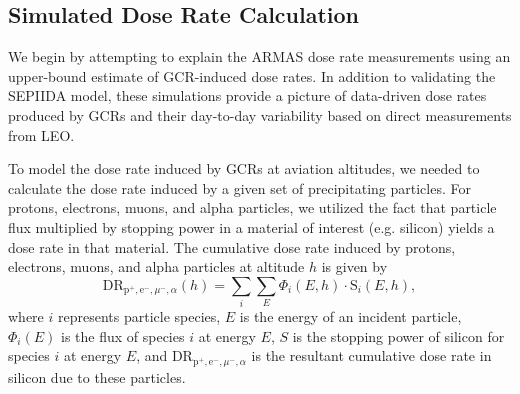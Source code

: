 \documentclass[draft]{agujournal2019}
\begin{document}
\subsection{Simulated Dose Rate Calculation}
\label{section:model:doserate_conversion}
We begin by attempting to explain the ARMAS dose rate measurements using an upper-bound estimate of GCR-induced dose rates. In addition to validating the SEPIIDA model, these simulations provide a picture of data-driven dose rates produced by GCRs and their day-to-day variability based on direct measurements from LEO.

To model the dose rate induced by GCRs at aviation altitudes, we needed to calculate the dose rate induced by a given set of precipitating particles. For protons, electrons, muons, and alpha particles, we utilized the fact that particle flux multiplied by stopping power in a material of interest (e.g. silicon) yields a dose rate in that material. The cumulative dose rate induced by protons, electrons, muons, and alpha particles at altitude $h$ is given by
%
\begin{equation}
  \text{DR}_{\text{p}^+,\text{e}^-,\mu^-,\alpha}(h) = \sum_i \sum_E \Phi_i(E,h) \cdot \text{S}_i(E,h),
\end{equation}
%
\noindent where $i$ represents particle species, $E$ is the energy of an incident particle, $\Phi_i(E)$ is the flux of species $i$ at energy $E$, $S$ is the stopping power of silicon for species $i$ at energy $E$, and DR$_{\text{p}^+,\text{e}^-,\mu^-,\alpha}$ is the resultant cumulative dose rate in silicon due to these particles.
\end{document}
